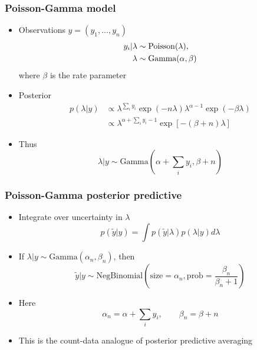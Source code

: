 \documentclass[10pt]{beamer}
\begin{document}
\begin{frame}
  \frametitle{Poisson-Gamma model}

  \begin{itemize}
  \item Observations $y=(y_1,\ldots,y_n)$
    \begin{align*}
      y_i|\lambda &\sim \operatorname{Poisson}(\lambda),\\
      \lambda &\sim \text{Gamma}(\alpha,\beta)
    \end{align*}
    where $\beta$ is the rate parameter
  \pause
  \item Posterior
    \begin{align*}
      p(\lambda|y) &\propto
      \lambda^{\sum_i y_i}\exp(-n\lambda)
      \lambda^{\alpha-1}\exp(-\beta\lambda)\\
      &\propto \lambda^{\alpha+\sum_i y_i-1}
      \exp[-(\beta+n)\lambda]
    \end{align*}
  \item<3-> Thus
    \[
      \lambda|y \sim \text{Gamma}\left(\alpha+\sum_i y_i,\beta+n\right)
    \]
  \end{itemize}
\end{frame}

\begin{frame}
  \frametitle{Poisson-Gamma posterior predictive}

  \begin{itemize}
  \item Integrate over uncertainty in $\lambda$
    \[
      p(\tilde{y}|y)=\int p(\tilde{y}|\lambda)p(\lambda|y)d\lambda
    \]
  \pause
  \item If $\lambda|y\sim\text{Gamma}(\alpha_n,\beta_n)$, then
    \[
      \tilde{y}|y\sim\text{NegBinomial}
      \left(\text{size}=\alpha_n,\text{prob}=\frac{\beta_n}{\beta_n+1}\right)
    \]
  \pause
  \item Here
    \[
      \alpha_n=\alpha+\sum_i y_i,\qquad \beta_n=\beta+n
    \]
  \item This is the count-data analogue of posterior predictive averaging
  \end{itemize}
\end{frame}
\end{document}
